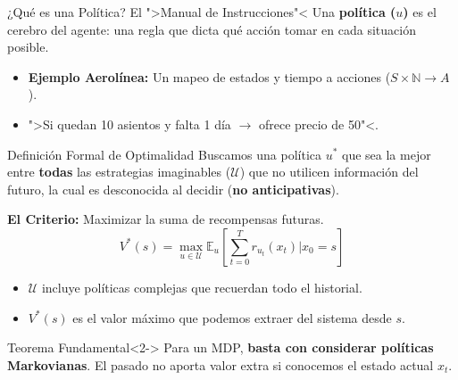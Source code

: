 \documentclass[xcolor=dvipsnames]{beamer}
\begin{document}
\begin{frame}{¿Qué es una Pol\'itica? El ">Manual de Instrucciones"<}
Una \textbf{pol\'itica ($u$)} es el cerebro del agente: una regla que dicta qu\'e acci\'on tomar en cada situaci\'on posible.

\begin{itemize}
    \item \textbf{Ejemplo Aerol\'inea:} Un mapeo de estados y tiempo a acciones ($S \times \mathbb{N}  \to A$).
    \item  ">Si quedan 10 asientos y falta 1 d\'ia $\to$ ofrece precio de 50"<.
\end{itemize}

\vspace{0.3cm}
\end{frame}

\begin{frame}{Definici\'on Formal de Optimalidad}
Buscamos una pol\'itica $u^*$ que sea la mejor entre \textbf{todas} las estrategias imaginables ($\mathcal{U}$) que no utilicen información del futuro, la cual es desconocida al decidir (\textbf{no anticipativas}).

\textbf{El Criterio:} Maximizar la suma de recompensas futuras.
\[ V^*(s) = \max_{u \in \mathcal{U}} \mathbb{E}_u \left[ \sum_{t=0}^T r_{u_t}(x_t) \bigg| x_0 = s \right] \]

\begin{itemize}
    \item $\mathcal{U}$ incluye pol\'iticas complejas que recuerdan todo el historial.
    \item $V^*(s)$ es el valor m\'aximo que podemos extraer del sistema desde $s$.
\end{itemize}

\begin{alertblock}{Teorema Fundamental}<2->
    Para un MDP, \textbf{basta con considerar pol\'iticas Markovianas}. El pasado no aporta valor extra si conocemos el estado actual $x_t$.
\end{alertblock}
\end{frame}
\end{document}
